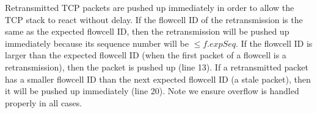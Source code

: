  Retransmitted TCP packets are pushed up immediately in order to allow the TCP stack to react without delay. 
If the flowcell ID of the retransmission is the same as the expected flowcell ID, then 
the retransmission will be pushed up immediately because its sequence number will be $\leq f.expSeq$. 
If the flowcell ID is larger
than the expected flowcell ID (when the first packet of a flowcell is a retransmission), then the packet is pushed up (line 13). 
If a retransmitted packet has a smaller flowcell ID than the next expected flowcell ID (a stale packet),
then it will be pushed up immediately (line 20). 
Note we ensure overflow is handled properly in all cases.




